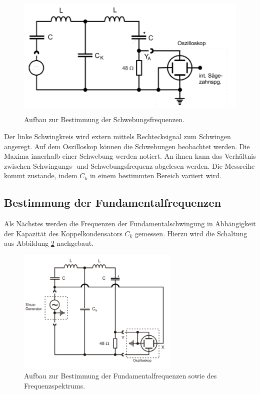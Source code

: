 \begin{figure}[H]
  \centering
  \includegraphics[height=6cm]{a.png}
  \caption{Aufbau zur Bestimmung der Schwebungsfrequenzen. \cite{sample}}
  \label{fig:4}
\end{figure}

Der linke Schwingkreis wird extern mittels Rechtecksignal zum Schwingen angeregt.
Auf dem Oszilloskop können die Schwebungen beobachtet werden.
Die Maxima innerhalb einer Schwebung werden notiert.
An ihnen kann das Verhältnis zwischen Schwingungs- und Schwebungsfrequenz abgelesen werden.
Die Messreihe kommt zustande, indem $C_k$ in einem bestimmten Bereich variiert wird.\\
\subsection{Bestimmung der Fundamentalfrequenzen}
\label{sec:d2}
Als Nächstes werden die Frequenzen der Fundamentalschwingung in Abhängigkeit der Kapazität des Koppelkondensators $C_k$ gemessen.
Hierzu wird die Schaltung aus Abbildung \ref{fig:5} nachgebaut.

\begin{figure}[H]
  \centering
  \includegraphics[height=6cm]{b.png}
  \caption{Aufbau zur Bestimmung der Fundamentalfrequenzen sowie des Frequenzspektrums. \cite{sample}}
  \label{fig:5}
\end{figure}

